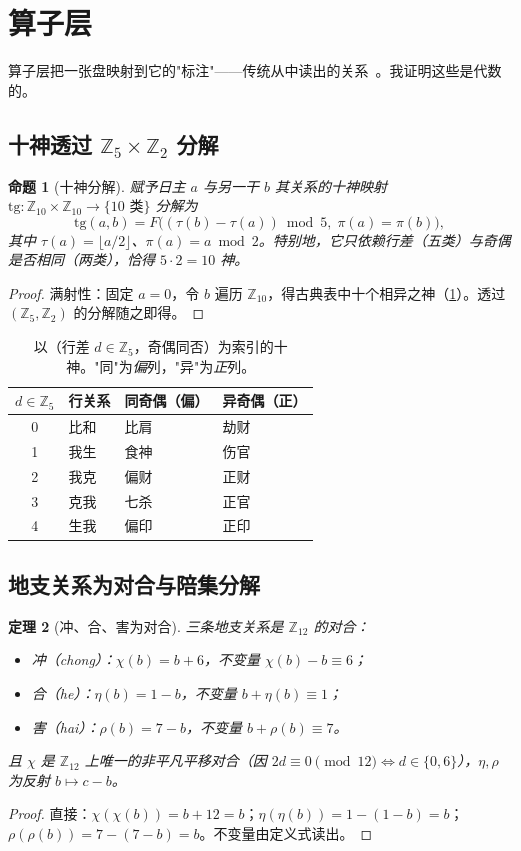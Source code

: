 \documentclass[11pt,a4paper,fontset=none]{ctexart}
\newtheorem{theorem}{定理}[section]
\newtheorem{proposition}[theorem]{命题}
\theoremstyle{definition}
\theoremstyle{remark}
\newcommand{\Z}{\mathbb{Z}}
\begin{document}
\section{算子层}\label{sec:operators}
算子层把一张盘映射到它的"标注"——传统从中读出的关系~\cite{yuanhai}。我证明这些是代数的。

\subsection{十神透过 \texorpdfstring{$\Z_5\times\Z_2$}{Z5xZ2} 分解}
\begin{proposition}[十神分解]\label{prop:tengod}
赋予日主 $a$ 与另一干 $b$ 其关系的\emph{十神}映射 $\mathrm{tg}:\Z_{10}\times\Z_{10}\to\{\text{10 类}\}$ 分解为
\[
\mathrm{tg}(a,b)=F\big((\tau(b)-\tau(a))\bmod 5,\;\pi(a)=\pi(b)\big),
\]
其中 $\tau(a)=\lfloor a/2\rfloor$、$\pi(a)=a\bmod 2$。特别地，它只依赖行差（五类）与奇偶是否相同（两类），恰得 $5\cdot 2=10$ 神。
\end{proposition}
\begin{proof}
满射性：固定 $a=0$，令 $b$ 遍历 $\Z_{10}$，得古典表中十个相异之神（\cref{tab:tengod}）。透过 $(\Z_5,\Z_2)$ 的分解随之即得。
\end{proof}

\begin{table}[h]\centering
\caption{以（行差 $d\in\Z_5$，奇偶同否）为索引的十神。"同"为\emph{偏}列，"异"为\emph{正}列。\label{tab:tengod}}
\small
\begin{tabular}{c l l l}
\toprule
$d\in\Z_5$ & 行关系 & 同奇偶（偏） & 异奇偶（正）\\
\midrule
0 & 比和 & 比肩 & 劫财\\
1 & 我生 & 食神 & 伤官\\
2 & 我克 & 偏财 & 正财\\
3 & 克我 & 七杀 & 正官\\
4 & 生我 & 偏印 & 正印\\
\bottomrule
\end{tabular}
\end{table}

\subsection{地支关系为对合与陪集分解}
\begin{theorem}[冲、合、害为对合]\label{thm:involutions}
三条地支关系是 $\Z_{12}$ 的对合：
\begin{itemize}[leftmargin=*]
  \item \emph{冲}（\emph{chong}）：$\chi(b)=b+6$，不变量 $\chi(b)-b\equiv6$；
  \item \emph{合}（\emph{he}）：$\eta(b)=1-b$，不变量 $b+\eta(b)\equiv1$；
  \item \emph{害}（\emph{hai}）：$\rho(b)=7-b$，不变量 $b+\rho(b)\equiv7$。
\end{itemize}
且 $\chi$ 是 $\Z_{12}$ 上唯一的非平凡平移对合（因 $2d\equiv0\pmod{12}\iff d\in\{0,6\}$），$\eta,\rho$ 为反射 $b\mapsto c-b$。
\end{theorem}
\begin{proof}
直接：$\chi(\chi(b))=b+12=b$；$\eta(\eta(b))=1-(1-b)=b$；$\rho(\rho(b))=7-(7-b)=b$。不变量由定义式读出。
\end{proof}
\end{document}

